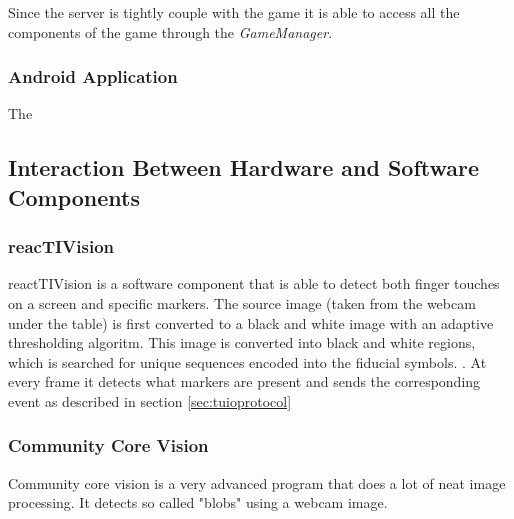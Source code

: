 \documentclass[a4paper,10pt]{article}
\begin{document}
		Since the server is tightly couple with the game it is able to access all the components of the game through the \emph{GameManager}.
		
		\subsubsection{Android Application}
		The 
		
	\subsection{Interaction Between Hardware and Software Components}
	

		\subsubsection{reacTIVision}
		\label{sec:reactivision}
		reactTIVision is a software component that is able to detect both finger touches on a screen and specific markers. 
		The source image (taken from the webcam under the table) is first converted to a black and white image with an adaptive thresholding algoritm. 
		This image is converted into black and white regions, which is searched for unique sequences encoded into the fiducial symbols. \cite{reactivision}.
		At every frame it detects what markers are present and sends the corresponding event as described in section \ref{sec:tuioprotocol}
		
		\subsubsection{Community Core Vision}
		\label{sec:communitycorevision}	
		Community core vision is a very advanced program that does a lot of neat image processing. 
		It detects so called "blobs" using a webcam image. 
\end{document}

